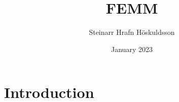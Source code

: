 \documentclass{article}
\title{FEMM}
\author{Steinarr Hrafn Höskuldsson}
\date{January 2023}
\begin{document}
\maketitle

\section{Introduction}
\end{document}
